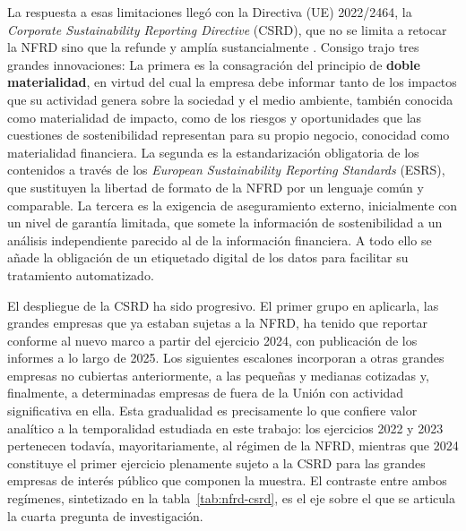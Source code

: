 La respuesta a esas limitaciones llegó con la Directiva (UE) 2022/2464, la
\textit{Corporate Sustainability Reporting Directive} (CSRD), que no se limita a retocar la
NFRD sino que la refunde y amplía sustancialmente \parencite{csrd2022}. Consigo trajo tres grandes innovaciones:
La primera es la consagración del principio de
\textbf{doble materialidad}, en virtud del cual la empresa debe informar tanto de los impactos
que su actividad genera sobre la sociedad y el medio ambiente, también conocida como materialidad de impacto, como
de los riesgos y oportunidades que las cuestiones de sostenibilidad representan para su propio
negocio, conocidad como materialidad financiera. La segunda es la estandarización obligatoria de los
contenidos a través de los \textit{European Sustainability Reporting Standards} (ESRS), que
sustituyen la libertad de formato de la NFRD por un lenguaje común y comparable. La tercera es
la exigencia de aseguramiento externo, inicialmente con un nivel de garantía limitada, que
somete la información de sostenibilidad a un análisis independiente parecido al de la información financiera. 
A todo ello se añade la obligación de un etiquetado digital de los datos para facilitar su tratamiento automatizado.

El despliegue de la CSRD ha sido progresivo. El primer grupo en aplicarla, las grandes empresas que
ya estaban sujetas a la NFRD, ha tenido que reportar conforme al nuevo marco a partir del
ejercicio 2024, con publicación de los informes a lo largo de 2025. Los siguientes escalones
incorporan a otras grandes empresas no cubiertas anteriormente, a las
pequeñas y medianas cotizadas y, finalmente, a determinadas empresas de fuera de la Unión con
actividad significativa en ella. Esta gradualidad es precisamente lo que confiere valor
analítico a la temporalidad estudiada en este trabajo: los ejercicios 2022 y 2023
pertenecen todavía, mayoritariamente, al régimen de la NFRD, mientras que 2024 constituye el
primer ejercicio plenamente sujeto a la CSRD para las grandes empresas de interés público que
componen la muestra. El contraste entre ambos regímenes, sintetizado en la
tabla~\ref{tab:nfrd-csrd}, es el eje sobre el que se articula la cuarta pregunta de
investigación.

